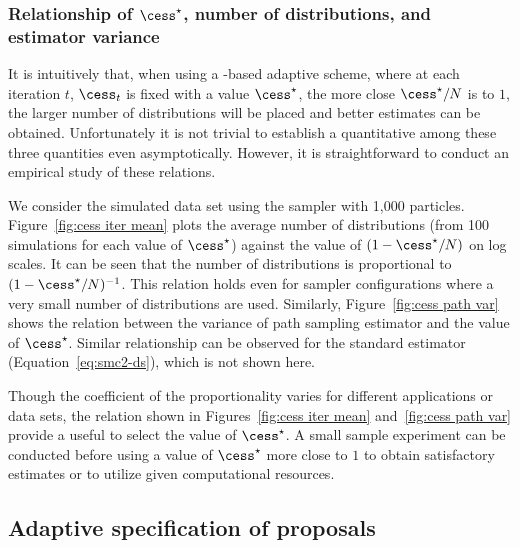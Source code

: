 \subsubsection[Relationship of cess*, number of distributions, and estimator variance]{Relationship of $\cess^\star$, number of distributions, and estimator variance}
\label{ssub:Relationship of cess*, number of distributions, and estimator variance}

It is intuitively  that, when using a \cess-based adaptive scheme, where at each iteration $t$, $\cess_t$ is fixed with a value $\cess^\star$, the more close $\cess^\star/N$ is to $1$, the larger  number of distributions  will be placed and better estimates can be obtained. Unfortunately it is not trivial to establish a quantitative  among these three quantities even asymptotically. However, it is straightforward to conduct an empirical study of these relations.

We consider the simulated \pet data set using the \smc[2] sampler with 1,000 particles. Figure~\ref{fig:cess iter mean} plots the average number of distributions (from 100 simulations for each value of $\cess^\star$) against the value of $(1 - \cess^\star/N)$ on log scales. It can be seen that the number of distributions is proportional to $(1 - \cess^\star/N)^{-1}$. This relation holds even for sampler configurations where a very small number of distributions are used. Similarly, Figure~\ref{fig:cess path var} shows the relation between the variance of path sampling estimator and the value of $\cess^\star$. Similar relationship can be observed for the standard estimator (Equation~\eqref{eq:smc2-ds}), which is not shown here.




Though the coefficient of the proportionality varies for different applications or data sets, the relation shown in Figures~\ref{fig:cess iter mean} and~\ref{fig:cess path var} provide a useful  to select the value of $\cess^\star$. A small sample experiment can be conducted before using a value of $\cess^\star$ more close to $1$ to obtain satisfactory estimates or to utilize given computational resources.

\subsection{Adaptive specification of proposals}
\label{sub:Adaptive specification of proposals}

